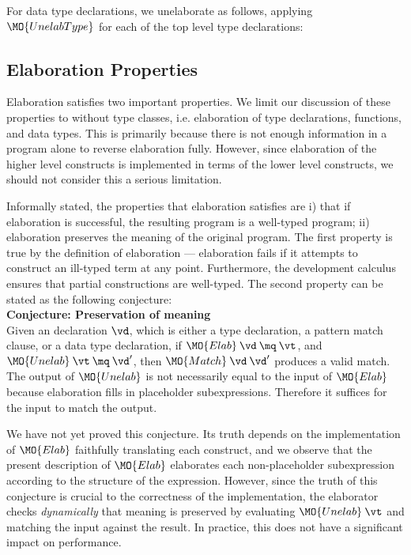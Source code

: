 \noindent
For data type declarations, we unelaborate as follows, applying $\MO{UnelabType}$
for each of the top level type declarations:



\subsection{Elaboration Properties}

Elaboration satisfies two important properties. We limit our discussion of
these properties to \IdrisM{} without type classes, i.e. elaboration of type 
declarations, functions, and data types. This is primarily because there is not
enough information in a \TT{} program alone to reverse elaboration fully. However, since
elaboration of the higher level \Idris{} constructs is implemented in terms of
the lower level \IdrisM{} constructs, we should not consider this a serious
limitation.

Informally stated, the properties that elaboration satisfies are
i) that if elaboration is successful, the
resulting program is a well-typed \TT{} program; ii) elaboration preserves the
meaning of the original \Idris{} program. The first property is true by the
definition of elaboration --- elaboration fails if it attempts to construct an ill-typed
term at any point. Furthermore, the development calculus \TTdev{} ensures that 
partial constructions are well-typed.
The second property can be stated as the following conjecture:
\\

\noindent
\textbf{Conjecture: Preservation of meaning}\\
Given an \IdrisM{} declaration $\vd$, which is either a type declaration, a
pattern match clause, or a data type declaration,
if $\MO{Elab}\:\vd\:\mq\:\vt$, and $\MO{Unelab}\:\vt\:\mq\:\vd'$,
then $\MO{Match}\:\vd\:\vd'$ produces a valid match.
\\

The output of $\MO{Unelab}$ is not necessarily equal to the input of $\MO{Elab}$
because elaboration fills in placeholder subexpressions. Therefore it suffices for
the input to match the output.

We have not yet proved this conjecture. Its truth depends on the implementation
of $\MO{Elab}$ faithfully translating each construct, and we observe that the
present description of $\MO{Elab}$ elaborates each non-placeholder subexpression
according to the structure of the expression. However, since the truth of this
conjecture is crucial to the correctness of the implementation, the elaborator
checks \emph{dynamically} that meaning is preserved by evaluating
$\MO{Unelab}\:\vt$ and matching the input against the result. In practice, this
does not have a significant impact on performance.


